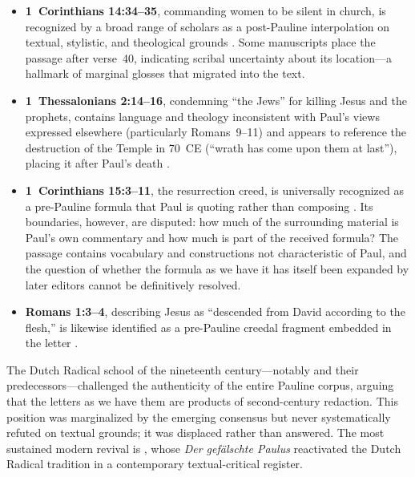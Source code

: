 \documentclass[12pt,oneside]{article}
\begin{document}
\begin{itemize}[leftmargin=2em]
\item \textbf{1~Corinthians 14:34--35}, commanding women to be silent
in church, is recognized by a broad range of scholars as a
post-Pauline interpolation on textual, stylistic, and theological
grounds \citep{Payne2009,Walker2001}.  Some manuscripts place the
passage after verse~40, indicating scribal uncertainty about its
location---a hallmark of marginal glosses that migrated into the text.

\item \textbf{1~Thessalonians 2:14--16}, condemning ``the Jews'' for
killing Jesus and the prophets, contains language and theology
inconsistent with Paul's views expressed elsewhere (particularly
Romans~9--11) and appears to reference the destruction of the Temple
in 70~CE (``wrath has come upon them at last''), placing it after
Paul's death \citep{Pearson1971,Schmidt1983}.

\item \textbf{1~Corinthians 15:3--11}, the resurrection creed, is
universally recognized as a pre-Pauline formula that Paul is quoting
rather than composing \citep{Conzelmann1975}.  Its boundaries,
however, are disputed: how much of the surrounding material is Paul's
own commentary and how much is part of the received formula?  The
passage contains vocabulary and constructions not characteristic of
Paul, and the question of whether the formula as we have it has itself
been expanded by later editors cannot be definitively resolved.

\item \textbf{Romans 1:3--4}, describing Jesus as ``descended from
David according to the flesh,'' is likewise identified as a
pre-Pauline creedal fragment embedded in the letter
\citep{Jewett2007}.
\end{itemize}

The Dutch Radical school of the nineteenth century---notably
\citet{VanManen1896} and their predecessors---challenged the
authenticity of the entire Pauline corpus, arguing that the letters as
we have them are products of second-century redaction.  This position
was marginalized by the emerging consensus but never systematically
refuted on textual grounds; it was displaced rather than answered.
The most sustained modern revival is \citet{Detering1995}, whose
\textit{Der gef\"alschte Paulus} reactivated the Dutch Radical
tradition in a contemporary textual-critical register.
\end{document}
